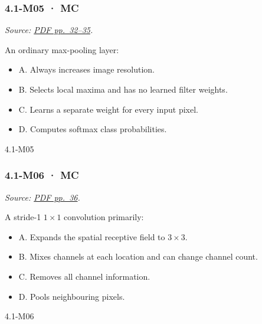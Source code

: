 \noindent\begin{minipage}{\linewidth}

\subsubsection{4.1-M05 · MC}\label{m05-mc-11}

\emph{Source: \href{../Lecture\%20Slides/4.1.\%20CNNs.pdf\#page=32}{PDF
pp.~32--35}.}

An ordinary max-pooling layer:

\begin{itemize}
\tightlist
\item
  A. Always increases image resolution.
\item
  B. Selects local maxima and has no learned filter weights.
\item
  C. Learns a separate weight for every input pixel.
\item
  D. Computes softmax class probabilities.
\end{itemize}

\begin{solution}[8mm]{4.1-M05}

\end{solution}
\end{minipage}\par\medskip

\noindent\begin{minipage}{\linewidth}

\subsubsection{4.1-M06 · MC}\label{m06-mc-11}

\emph{Source: \href{../Lecture\%20Slides/4.1.\%20CNNs.pdf\#page=36}{PDF
pp.~36}.}

A stride-1 \(1\times1\) convolution primarily:

\begin{itemize}
\tightlist
\item
  A. Expands the spatial receptive field to \(3\times3\).
\item
  B. Mixes channels at each location and can change channel count.
\item
  C. Removes all channel information.
\item
  D. Pools neighbouring pixels.
\end{itemize}

\begin{solution}[8mm]{4.1-M06}

\end{solution}
\end{minipage}\par\medskip

